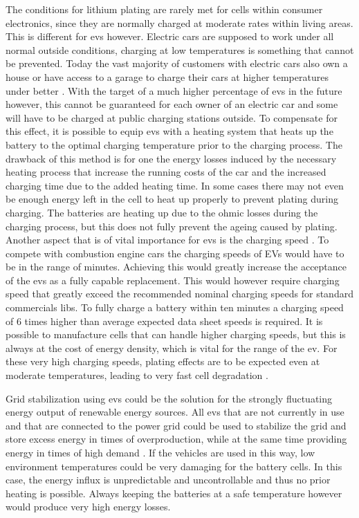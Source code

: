The conditions for lithium plating are rarely met for cells within consumer electronics, since they are normally charged at moderate rates within living areas. This is different for \gls{ev}s however. Electric cars are supposed to work under all normal outside conditions, charging at low temperatures is something that cannot be prevented. Today the vast majority of customers with electric cars also own a house or have access to a garage to charge their cars at higher temperatures under better \cite{Nobis.2019}. With the target of a much higher percentage of \gls{ev}s in the future however, this cannot be guaranteed for each owner of an electric car and some will have to be charged at public charging stations outside. To compensate for this effect, it is possible to equip \gls{ev}s with a heating system that heats up the battery to the optimal charging temperature prior to the charging process. The drawback of this method is for one the energy losses induced by the necessary heating process that increase the running costs of the car and the increased charging time due to the added heating time. In some cases there may not even be enough energy left in the cell to heat up properly to prevent plating during charging. The batteries are heating up due to the ohmic losses during the charging process, but this does not fully prevent the ageing caused by plating. Another aspect that is of vital importance for \gls{ev}s is the charging speed \cite{Farjah.2018}. To compete with combustion engine cars the charging speeds of EVs would have to be in the range of minutes. Achieving this would greatly increase the acceptance of the \gls{ev}s as a fully capable replacement. This would however require charging speed that greatly exceed the recommended nominal charging speeds for standard commercials \gls{lib}s. To fully charge a battery within ten minutes a charging speed of 6 times higher than average expected data sheet speeds is required. It is possible to manufacture cells that can handle higher charging speeds, but this is always at the cost of energy density, which is vital for the range of the \gls{ev}. For these very high charging speeds, plating effects are to be expected even at moderate temperatures, leading to very fast cell degradation \cite{Waldmann.2018}. \par
Grid stabilization using \gls{ev}s could be the solution for the strongly fluctuating energy output of renewable energy sources. All \gls{ev}s that are not currently in use and that are connected to the power grid could be used to stabilize the grid and store excess energy in times of overproduction, while at the same time providing energy in times of high demand \cite{Nunes.2017,Pramana.2017,Quinn.2010,Yan.2014}. If the vehicles are used in this way, low environment temperatures could be very damaging for the battery cells. In this case, the energy influx is unpredictable and uncontrollable and thus no prior heating is possible. Always keeping the batteries at a safe temperature however would produce very high energy losses. \par
